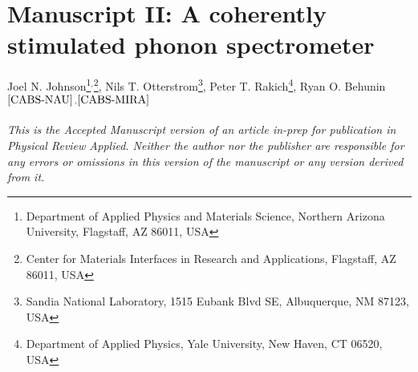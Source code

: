 \setcounter{rownumber}{0}
\chapter{Manuscript II: A coherently stimulated phonon spectrometer}
\label{ch:CABS}
\acresetall


%
Joel N. Johnson\footnote{\label{CABS-NAU}
Department of Applied Physics and Materials Science, Northern Arizona University, Flagstaff, AZ 86011, USA
}$^,$\footnote{\label{CABS-MIRA}
Center for Materials Interfaces in Research and Applications, Flagstaff, AZ 86011, USA
},
Nils T. Otterstrom\footnote{\label{CABS-Sandia}
Sandia National Laboratory, 1515 Eubank Blvd SE, Albuquerque, NM 87123, USA
},
Peter T. Rakich\footnote{\label{CABS-Yale}
Department of Applied Physics, Yale University, New Haven, CT 06520, USA
},
Ryan O. Behunin$^\mathrm{\ref{CABS-NAU}}$$^,$$^\mathrm{\ref{CABS-MIRA}}$

\hfill

%
\textit{This is the Accepted Manuscript version of an article in-prep for publication in Physical Review Applied. Neither the author nor the publisher are responsible for any errors or omissions in this version of the manuscript or any version derived from it.}

\doublespacing




